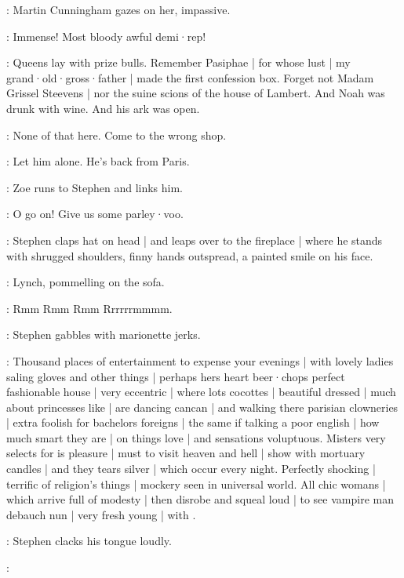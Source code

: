 :
Martin Cunningham gazes on her,
impassive.

\MartinCunningham:
Immense!
Most bloody awful demi·rep!


\Stephen:
Queens lay with prize bulls.
Remember Pasiphae |
for whose lust |
my grand·old·gross·father |
made the first confession box.
Forget not Madam Grissel Steevens |
nor the suine scions of the house of Lambert.
And Noah was drunk with wine.
And his ark was open.

\Bella:
None of that here.
Come to the wrong shop.

\Lynch:
Let him alone.
He's back from Paris.

:
Zoe runs to Stephen and links him.

\Zoe:
O go on!
Give us some parley·voo.

:
Stephen claps hat on head |
and leaps over to the fireplace |
where he stands with shrugged shoulders,
finny hands outspread,
a painted smile on his face.

:
Lynch,
pommelling on the sofa.

\Lynch:
Rmm Rmm Rmm Rrrrrrmmmm.

:
Stephen gabbles with marionette jerks.

\Stephen:
Thousand places of entertainment to expense your evenings |
with lovely ladies saling gloves and other things |
perhaps hers heart beer·chops perfect fashionable house |
very eccentric |
where lots cocottes |
beautiful dressed |
much about princesses like |
are dancing cancan |
and walking there parisian clowneries |
extra foolish for bachelors foreigns |
the same if talking a poor english |
how much smart they are |
on things love |
and sensations voluptuous.
Misters very selects for is pleasure |
must to visit heaven and hell |
show with mortuary candles |
and they tears silver |
which occur every night.
%
Perfectly shocking |
terrific of religion's things |
mockery seen in universal world.
All chic womans |
which arrive full of modesty |
then disrobe and squeal loud |
to see vampire man debauch nun |
very fresh young |
with .

:
Stephen clacks his tongue loudly.

\Stephen:

